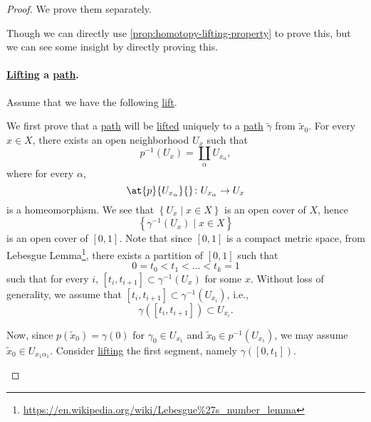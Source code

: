 \begin{proof}
	We prove them separately.
	\begin{note}
		Though we can directly use \autoref{prop:homotopy-lifting-property} to prove this, but we can see some insight by directly proving this.
	\end{note}

	\paragraph{\hyperref[def:lift]{Lifting} a \hyperref[def:path]{path}.} Assume that we have the following \hyperref[def:lift]{lift}.
	\begin{figure}[H]
		\centering
		\label{fig:pf:col:lec14}
	\end{figure}
	We first prove that a \hyperref[def:path]{path} will be \hyperref[prop:homotopy-lifting-property]{lifted} uniquely to a \hyperref[def:path]{path} \(\widetilde{\gamma} \)
	from \(\widetilde{x} _0\). For every \(x\in X\), there exists an open neighborhood \(U_x\) such that
	\[
		p^{-1} (U_{x} ) = \coprod\limits_{\alpha }U_{x_\alpha },
	\]
	where for every \(\alpha \),
	\[
		\at{p}{U_{x_\alpha }}{} \colon U_{x_{\alpha }}\to U_{x}
	\]
	is a homeomorphism. We see that \(\left\{U_{x} \mid x\in X\right\}\) is an open cover of \(X\), hence
	\[
		\left\{\gamma ^{-1} (U_{x} )\mid x\in X\right\}
	\]
	is an open cover of \([0, 1]\). Note that since \([0, 1]\) is a compact metric space, from Lebesgue Lemma\footnote{\url{https://en.wikipedia.org/wiki/Lebesgue\%27s_number_lemma}},
	there exists a partition of \([0, 1]\) such that
	\[
		0 = t_0 < t_1 < \dots  < t_{k} = 1
	\]
	such that for every \(i\), \([t_{i} , t_{i+1}]\subset \gamma ^{-1} (U_{x} ) \) for some \(x\). Without loss of generality, we assume that \([t_{i} , t_{i+1}]\subset \gamma ^{-1} (U_{x_{i}})\),
	i.e.,
	\[
		\gamma ([t_{i} , t_{i+1}])\subset U_{x_{i} }.
	\]
	\begin{figure}[H]
		\centering
		\label{fig:pf:col:lec14-2}
	\end{figure}
	Now, since \(p(\widetilde{x} _0) = \gamma (0)\) for \(\gamma _0\in U_{x_1}\) and \(\widetilde{x} _0\in p^{-1} (U_{x_1})\), we may assume \(\widetilde{x} _0\in U_{x_1 \alpha _1}\).
	Consider \hyperref[prop:homotopy-lifting-property]{lifting} the first segment, namely \(\gamma ([0, t_1])\).
	\begin{figure}[H]
		\centering
		\label{fig:pf:col:lec14-3}
	\end{figure}

\end{proof}

